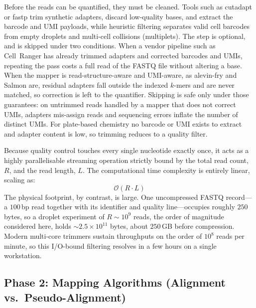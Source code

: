 Before the reads can be quantified, they must be cleaned. Tools such as cutadapt or fastp trim synthetic adapters, discard low-quality bases, and extract the barcode and UMI payloads, while heuristic filtering separates valid cell barcodes from empty droplets and multi-cell collisions (multiplets). The step is optional, and is skipped under two conditions. When a vendor pipeline such as Cell~Ranger has already trimmed adapters and corrected barcodes and UMIs, repeating the pass costs a full read of the FASTQ file without altering a base. When the mapper is read-structure-aware and UMI-aware, as alevin-fry and Salmon are, residual adapters fall outside the indexed $k$-mers and are never matched, so correction is left to the quantifier. Skipping is safe only under those guarantees: on untrimmed reads handled by a mapper that does not correct UMIs, adapters mis-assign reads and sequencing errors inflate the number of distinct UMIs. For plate-based chemistry no barcode or UMI exists to extract and adapter content is low, so trimming reduces to a quality filter.

Because quality control touches every single nucleotide exactly once, it acts as a highly parallelisable streaming operation strictly bound by the total read count, $R$, and the read length, $L$. The computational time complexity is entirely linear, scaling as:
$$ \mathcal{O}(R \cdot L) $$
The physical footprint, by contrast, is large. One uncompressed FASTQ record---a $100$\,bp read together with its identifier and quality line---occupies roughly $250$ bytes, so a droplet experiment of $R \sim 10^{9}$ reads, the order of magnitude considered here, holds $\sim 2.5 \times 10^{11}$ bytes, about $250$\,GB before compression. Modern multi-core trimmers sustain throughputs on the order of $10^{8}$ reads per minute, so this I/O-bound filtering resolves in a few hours on a single workstation.

\subsection{Phase 2: Mapping Algorithms (Alignment vs.\ Pseudo-Alignment)}

